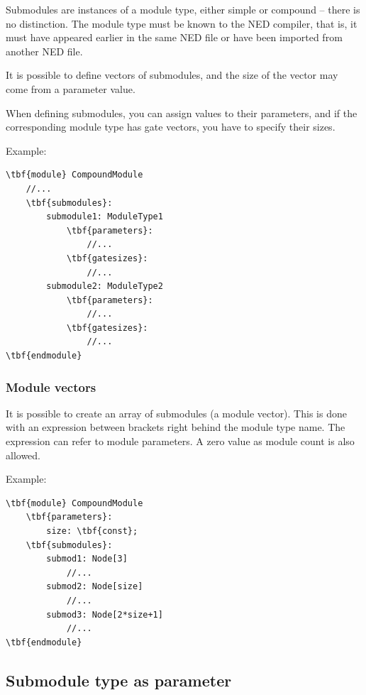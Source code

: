 Submodules are instances of a module type, either simple
or compound -- there is no distinction. The module type
must be known to the NED compiler, that is, it must have appeared
earlier in the same NED file or have been imported from another
NED file.

It is possible to define vectors of submodules, and the
size of the vector may come from a parameter value.

When defining submodules, you can assign values to their
parameters, and if the corresponding module type has gate vectors,
you have to specify their sizes.


Example:

\begin{Verbatim}[commandchars=\\\{\}]
\tbf{module} CompoundModule
    //...
    \tbf{submodules}:
        submodule1: ModuleType1
            \tbf{parameters}:
                //...
            \tbf{gatesizes}:
                //...
        submodule2: ModuleType2
            \tbf{parameters}:
                //...
            \tbf{gatesizes}:
                //...
\tbf{endmodule}
\end{Verbatim}


\subsubsection{Module vectors}


It is possible to create an array of
submodules (a module
vector).  This is done with an expression between
brackets right behind the module type name. The expression can refer
to module parameters. A zero value as module count is also allowed.

Example:

\begin{Verbatim}[commandchars=\\\{\}]
\tbf{module} CompoundModule
    \tbf{parameters}:
        size: \tbf{const};
    \tbf{submodules}:
        submod1: Node[3]
            //...
        submod2: Node[size]
            //...
        submod3: Node[2*size+1]
            //...
\tbf{endmodule}
\end{Verbatim}



\subsection{Submodule type as parameter}
\label{sec:ch-ned-lang:like}

